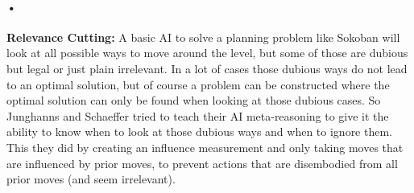 \documentclass{article}
\begin{document}
\paragraph*{•}
\textbf{Relevance Cutting:} A basic AI to solve a planning problem like Sokoban will look at all possible ways to move around the level, but some of those are dubious but legal or just plain irrelevant. In a lot of cases those dubious ways do not lead to an optimal solution, but of course a problem can be constructed where the optimal solution can only be found when looking at those dubious cases. So Junghanns and Schaeffer tried to teach their AI meta-reasoning to give it the ability to know when to look at those dubious ways and when to ignore them. This they did by creating an influence measurement and only taking moves that are influenced by prior moves, to prevent actions that are disembodied from all prior moves (and seem irrelevant).
\newpage
\end{document}
